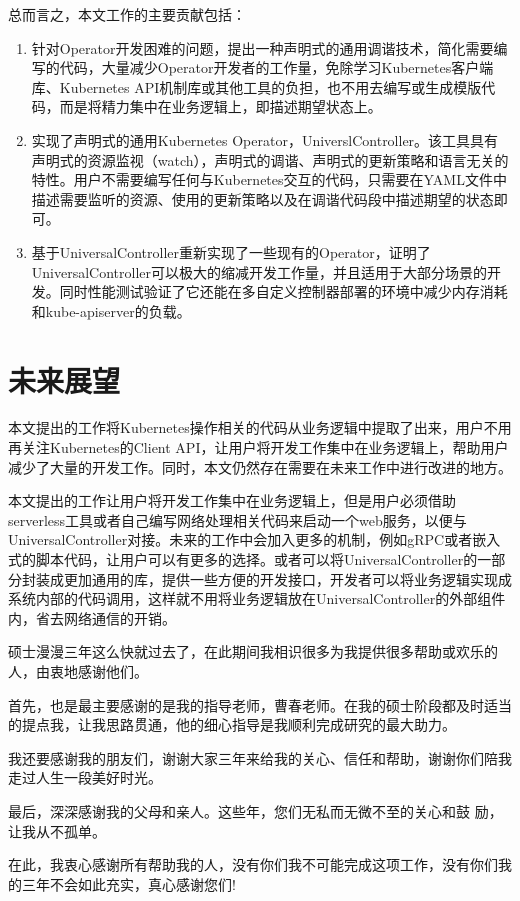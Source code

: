 \documentclass[macfonts,master]{njuthesis}
\begin{document}
总而言之，本文工作的主要贡献包括：

\begin{enumerate}
	\item 针对Operator开发困难的问题，提出一种声明式的通用调谐技术，简化需要编写的代码，大量减少Operator开发者的工作量，免除学习Kubernetes客户端库、Kubernetes API机制库或其他工具的负担，也不用去编写或生成模版代码，而是将精力集中在业务逻辑上，即描述期望状态上。
	\item 实现了声明式的通用Kubernetes Operator，UniverslController。该工具具有声明式的资源监视（watch），声明式的调谐、声明式的更新策略和语言无关的特性。用户不需要编写任何与Kubernetes交互的代码，只需要在YAML文件中描述需要监听的资源、使用的更新策略以及在调谐代码段中描述期望的状态即可。
	\item 基于UniversalController重新实现了一些现有的Operator，证明了UniversalController可以极大的缩减开发工作量，并且适用于大部分场景的开发。同时性能测试验证了它还能在多自定义控制器部署的环境中减少内存消耗和kube-apiserver的负载。
\end{enumerate}

\section{未来展望}
本文提出的工作将Kubernetes操作相关的代码从业务逻辑中提取了出来，用户不用再关注Kubernetes的Client API，让用户将开发工作集中在业务逻辑上，帮助用户减少了大量的开发工作。同时，本文仍然存在需要在未来工作中进行改进的地方。

本文提出的工作让用户将开发工作集中在业务逻辑上，但是用户必须借助serverless工具或者自己编写网络处理相关代码来启动一个web服务，以便与UniversalController对接。未来的工作中会加入更多的机制，例如gRPC或者嵌入式的脚本代码，让用户可以有更多的选择。或者可以将UniversalController的一部分封装成更加通用的库，提供一些方便的开发接口，开发者可以将业务逻辑实现成系统内部的代码调用，这样就不用将业务逻辑放在UniversalController的外部组件内，省去网络通信的开销。
\begin{acknowledgement}
  硕士漫漫三年这么快就过去了，在此期间我相识很多为我提供很多帮助或欢乐的人，由衷地感谢他们。
  
首先，也是最主要感谢的是我的指导老师，曹春老师。在我的硕士阶段都及时适当的提点我，让我思路贯通，他的细心指导是我顺利完成研究的最大助力。

我还要感谢我的朋友们，谢谢大家三年来给我的关心、信任和帮助，谢谢你们陪我走过人生一段美好时光。

最后，深深感谢我的父母和亲人。这些年，您们无私而无微不至的关心和鼓 励，让我从不孤单。

在此，我衷心感谢所有帮助我的人，没有你们我不可能完成这项工作，没有你们我的三年不会如此充实，真心感谢您们!
\end{acknowledgement}
\end{document}
